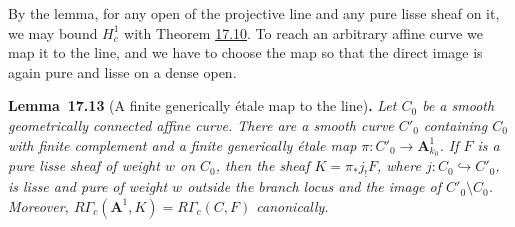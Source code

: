 \documentclass[11pt]{article}
\newenvironment{bpstatement}[2]{\par\addvspace{0.6\baselineskip}\noindent\textbf{#1}#2\textbf{.}\enspace\ignorespaces}
  {\par\addvspace{0.4\baselineskip}}
\newenvironment{bpstatementit}[2]{\begin{bpstatement}{#1}{#2}\itshape\ignorespaces}{\end{bpstatement}}
\begin{document}
\label{bp40}%
By the lemma, for any open of the projective line and any pure lisse sheaf on it, we may bound \(H^1_c\) with Theorem \hyperref[bp30]{17.10}. To reach an arbitrary affine curve we map it to the line, and we have to choose the map so that the direct image is again pure and lisse on a dense open.

\label{bp41}%
\begin{bpstatementit}{Lemma~17.13}{ (A finite generically étale map to the line)}
Let \(C_0\) be a smooth geometrically connected affine curve. There are a smooth curve \(C'_0\) containing \(C_0\) with finite complement and a finite generically étale map \(\pi:C'_0\to\mathbf A^1_{k_0}\). If \(F\) is a pure lisse sheaf of weight \(w\) on \(C_0\), then the sheaf \(K=\pi_*j_!F\), where \(j:C_0\hookrightarrow C'_0\), is lisse and pure of weight \(w\) outside the branch locus and the image of \(C'_0\setminus C_0\). Moreover, \(R\Gamma_c(\mathbf A^1,K)=R\Gamma_c(C,F)\) canonically.
\end{bpstatementit}
\end{document}
